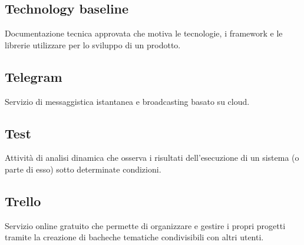 \documentclass[../glossario.tex]{subfiles}
\begin{document}
\subsection*{Technology baseline} 
Documentazione tecnica approvata che motiva le tecnologie, i framework e le librerie utilizzare per lo sviluppo di un prodotto.

\subsection*{Telegram} 
Servizio di messaggistica istantanea e broadcasting basato su cloud.

\subsection*{Test} 
Attività di analisi dinamica che osserva i risultati dell'esecuzione di un sistema (o parte di esso) sotto determinate condizioni.

\subsection*{Trello} 
Servizio online gratuito che permette di organizzare e gestire i propri progetti tramite la creazione di bacheche tematiche condivisibili con altri utenti.



    
\end{document}
